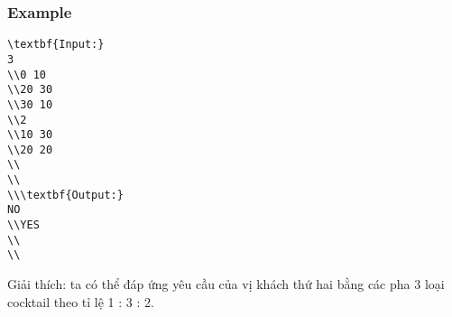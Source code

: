 \subsubsection{   Example  }
\begin{verbatim}
\textbf{Input:}
3
\\0 10
\\20 30 
\\30 10
\\2
\\10 30
\\20 20
\\
\\
\\\textbf{Output:}
NO
\\YES
\\
\\\end{verbatim}

Giải thích: ta có thể đáp ứng yêu cầu của vị khách thứ hai bằng các pha 3 loại cocktail theo tỉ lệ 1 : 3 : 2.
